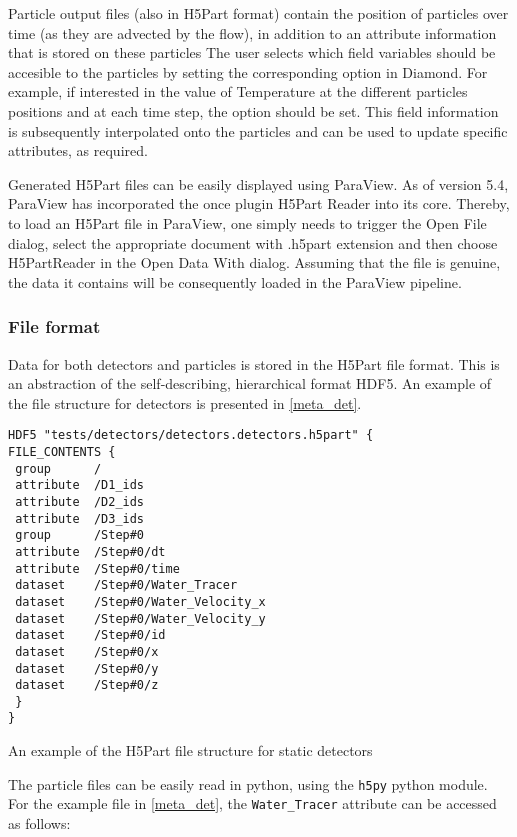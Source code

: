 Particle output files (also in H5Part format) contain the position of particles over time (as they are advected by the flow), in addition to an attribute information that is stored on these particles The user selects which field variables should be accesible to the particles by setting the corresponding option in Diamond. For example, if interested in the value of Temperature at the different particles positions and at each time step, the option   should be set. This field information is subsequently interpolated onto the particles and can be used to update specific attributes, as required.

Generated H5Part files can be easily displayed using ParaView. As of version 5.4, ParaView has incorporated the once plugin H5Part Reader into its core. Thereby, to load an H5Part file in ParaView, one simply needs to trigger the Open File dialog, select the appropriate document with .h5part extension and then choose H5PartReader in the Open Data With dialog. Assuming that the file is genuine, the data it contains will be consequently loaded in the ParaView pipeline.

\subsubsection{File format}
\label{sec:detectors_output}

Data for both detectors and particles is stored in the H5Part file
format. This is an abstraction of the self-describing, hierarchical
format HDF5. An example of the file structure for detectors is
presented in \ref{meta_det}.

\begin{example}
  \begin{lstlisting}
HDF5 "tests/detectors/detectors.detectors.h5part" {
FILE_CONTENTS {
 group      /
 attribute  /D1_ids
 attribute  /D2_ids
 attribute  /D3_ids
 group      /Step#0
 attribute  /Step#0/dt
 attribute  /Step#0/time
 dataset    /Step#0/Water_Tracer
 dataset    /Step#0/Water_Velocity_x
 dataset    /Step#0/Water_Velocity_y
 dataset    /Step#0/id
 dataset    /Step#0/x
 dataset    /Step#0/y
 dataset    /Step#0/z
 }
}
  \end{lstlisting}

  \caption{An example of the H5Part file structure for static detectors}
  \label{meta_det}
\end{example}

The particle files can be easily read in python, using the \lstinline[language=python]*h5py* python module. For the example file in \ref{meta_det}, the \lstinline[language=python]*Water_Tracer* attribute can be accessed as follows:


